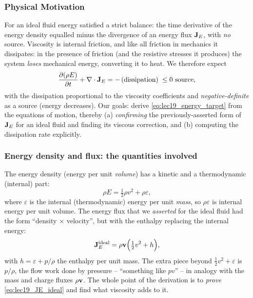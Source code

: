 \documentclass[../main.tex]{subfiles}
\begin{document}
\subsubsection*{Physical Motivation}
For an ideal fluid energy satisfied a strict balance: the time derivative of the energy density equalled minus the divergence of an energy flux $\mathbf{J}_E$, with \emph{no} source. Viscosity is internal friction, and like all friction in mechanics it dissipates: in the presence of friction (and the resistive stresses it produces) the system \emph{loses} mechanical energy, converting it to heat. We therefore expect
\begin{equation}
  \pdv{(\rho E)}{t} + \nabla \cdot\mathbf{J}_E = -\,(\text{dissipation}) \;\le 0\ \text{source},
  \label{eq:lec19_energy_target}
\end{equation}
with the dissipation proportional to the viscosity coefficients and \emph{negative-definite} as a source (energy decreases). Our goals: derive \eqref{eq:lec19_energy_target} from the equations of motion, thereby (a) \emph{confirming} the previously-asserted form of $\mathbf{J}_E$ for an ideal fluid and finding its viscous correction, and (b) computing the dissipation rate explicitly.

\subsubsection*{Energy density and flux: the quantities involved}
The energy density (energy per unit \emph{volume}) has a kinetic and a thermodynamic (internal) part:
\begin{equation}
  \rho E = \tfrac12\rho v^2 + \rho\varepsilon ,
  \label{eq:lec19_energy_density}
\end{equation}
where $\varepsilon$ is the internal (thermodynamic) energy per unit \emph{mass}, so $\rho\varepsilon$ is internal energy per unit volume. The energy flux that we \emph{asserted} for the ideal fluid had the form ``density $\times$ velocity'', but with the enthalpy replacing the internal energy:
\begin{equation}
  \mathbf{J}_E^{\text{ideal}} = \rho\mathbf{v}\Big(\tfrac12 v^2 + h\Big),
  \label{eq:lec19_JE_ideal}
\end{equation}
with $h=\varepsilon+p/\rho$ the enthalpy per unit mass. The extra piece beyond $\tfrac12 v^2+\varepsilon$ is $p/\rho$, the flow work done by pressure -- ``something like $pv$'' -- in analogy with the mass and charge fluxes $\rho\mathbf{v}$. The whole point of the derivation is to \emph{prove} \eqref{eq:lec19_JE_ideal} and find what viscosity adds to it.
\end{document}
